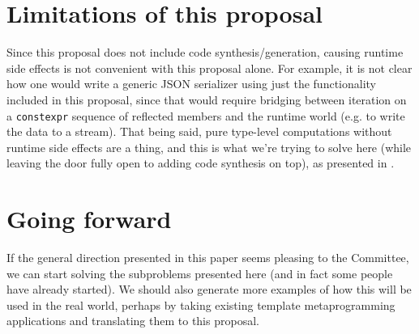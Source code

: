 \documentclass{wg21}
\newcommand{\cc}[1]{\texttt{#1}}
\begin{document}
%
%
%
%
%
%
%
%



\section{Limitations of this proposal}
Since this proposal does not include code synthesis/generation, causing runtime
side effects is not convenient with this proposal alone. For example, it is not
clear how one would write a generic JSON serializer using just the functionality
included in this proposal, since that would require bridging between iteration
on a \cc{constexpr} sequence of reflected members and the runtime world (e.g.
to write the data to a stream). That being said, pure type-level computations
without runtime side effects are a thing, and this is what we're trying to solve
here (while leaving the door fully open to adding code synthesis on top), as
presented in \cite{P0633}.


\section{Going forward}
If the general direction presented in this paper seems pleasing to the Committee,
we can start solving the subproblems presented here (and in fact some people have
already started). We should also generate more examples of how this will be used
in the real world, perhaps by taking existing template metaprogramming applications
and translating them to this proposal.
\end{document}
